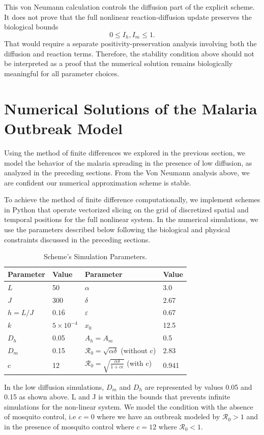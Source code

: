 \documentclass[12pt]{article}
\begin{document}
This von Neumann calculation controls the diffusion part of the explicit scheme. It does not prove that the full nonlinear reaction-diffusion update preserves the biological bounds
\[
0\leq I_h,I_m\leq 1.
\]
That would require a separate positivity-preservation analysis involving both the diffusion and reaction terms. Therefore, the stability condition above should not be interpreted as a proof that the numerical solution remains biologically meaningful for all parameter choices.

\section{Numerical Solutions of the Malaria Outbreak Model}

Using the method of finite differences we explored in the previous section, we model the behavior of the malaria spreading in the presence of low diffusion, as analyzed in the preceding sections. From the Von Neumann analysis above, we are confident our numerical approximation scheme is stable.

To achieve the method of finite difference computationally, we implement schemes in Python that operate vectorized slicing on the grid of discretized spatial and temporal positions for the full nonlinear system. In the numerical simulations, we use the parameters described below following the biological and physical constraints discussed in the preceding sections.
\begin{table}[H]
\centering
\caption{Scheme's Simulation Parameters.}
\begin{tabular}{|l|l|l|l|}
\hline
Parameter & Value & Parameter & Value \\
\hline
$L$ & 50 & $\alpha$ & 3.0 \\\hline
$J$ & 300 & $\delta$ & 2.67 \\\hline
$h = L/J$ & $0.1\overline{6}$ & $\varepsilon$ & 0.67 \\\hline
$k$ & $5\times10^{-4}$ & $x_0$ & 12.5 \\\hline
$D_h$ & 0.05 & $A_h = A_m$ & 0.5 \\\hline
$D_m$ & 0.15 & $\mathcal{R}_0 = \sqrt{\alpha\delta}$ (without c)& $ 2.83$\\
\hline
 c& 12& $\mathcal{R}_0 = \sqrt{\frac{\alpha\delta}{1+c\epsilon}}$ (with c)&0.941\\ \hline
\end{tabular}
\end{table}
In the low diffusion simulations, $D_m$ and $D_h$ are represented by values 0.05 and 0.15 as shown above. L and J is within the bounds that prevents infinite simulations for the non-linear system. We model the condition with the absence of mosquito control, i.e $c = 0$ where we have an outbreak modeled by $\mathcal{R}_0 > 1$ and in the presence of mosquito control where $c = 12$ where $\mathcal{R}_0 <1.$
\end{document}
